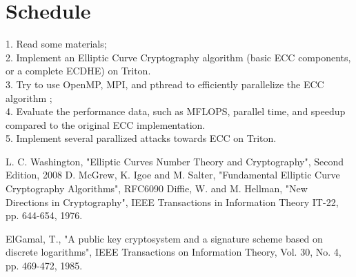 \documentclass[10pt,a4paper]{article}
\begin{document}
\section{Schedule}
1. Read some materials; \\
2. Implement an Elliptic Curve Cryptography algorithm (basic ECC components, or a complete ECDHE) on Triton.\\
3. Try to use OpenMP, MPI, and pthread to efficiently parallelize
the ECC algorithm ; \\
4. Evaluate the performance data, such as MFLOPS, parallel time, and speedup compared to the original ECC implementation.\\
5. Implement several parallized attacks towards ECC on Triton.\\
\begin{thebibliography}{}
     L. C. Washington, "Elliptic Curves Number Theory and Cryptography", Second Edition, 2008
     D. McGrew, K. Igoe and M. Salter, "Fundamental Elliptic Curve Cryptography Algorithms", RFC6090
     Diffie, W. and M. Hellman, "New Directions in
                Cryptography", IEEE Transactions in Information
                Theory IT-22, pp. 644-654, 1976.

     ElGamal, T., "A public key cryptosystem and a signature
                scheme based on discrete logarithms", IEEE Transactions
                on Information Theory, Vol. 30, No. 4, pp. 469-472,
                1985.

    \end{thebibliography}
\end{document}

